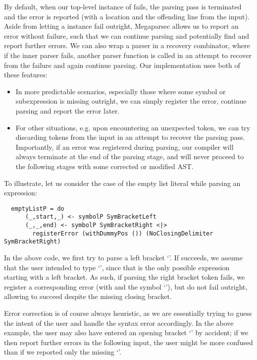By default, when our top-level instance of  fails, the
parsing pass is terminated and the error is reported (with a location and the
offending line from the input).
Aside from letting a  instance fail outright, Megaparsec
allows us to report an error without failure, such that we can continue parsing
and potentially find and report further errors.
We can also wrap a parser in a recovery combinator, where if the inner parser
fails, another parser function is called in an attempt to recover from the
failure and again continue parsing.
Our implementation uses both of these features:
\begin{itemize}
  \item In more predictable scenarios, especially those where some symbol or
        subexpression is missing outright, we can simply register the error,
        continue parsing and report the error later.
  \item For other situations, e.g. upon encountering an unexpected token, we can
        try discarding tokens from the input in an attempt to recover the
        parsing pass. Importantly, if an error was registered during parsing,
        our compiler will always terminate at the end of the parsing stage, and
        will never proceed to the following stages with some corrected or
        modified AST.
\end{itemize}

To illustrate, let us consider the case of the empty list literal \spl{[]} while
parsing an expression:
\begin{verbatim}
  emptyListP = do
      (_,start,_) <- symbolP SymBracketLeft
      (_,_,end) <- symbolP SymBracketRight <|>
        registerError (withDummyPos ()) (NoClosingDelimiter SymBracketRight)
\end{verbatim}
%
In the above code, we first try to parse a left bracket `\code{[}'. If
 succeeds, we assume that the user intended to
type `\code{[]}', since that is the only possible expression starting with a
left bracket.
As such, if parsing the right bracket token fails, we register a corresponding
error (with  and the symbol `\code{]}'),
but do not fail outright, allowing  to succeed despite the
missing closing bracket.

Error correction is of course always heuristic, as we are essentially trying to
guess the intent of the user and handle the syntax error accordingly.
In the above example, the user may also have entered an opening bracket
`\code{[}' by accident; if we then report further errors in the following input,
the user might be more confused than if we reported only the missing `\code{]}'.




